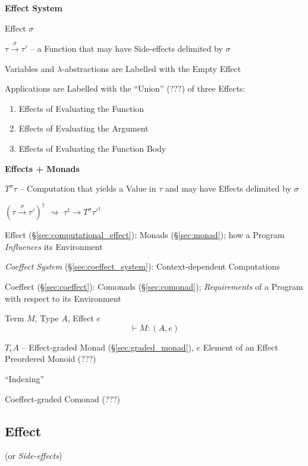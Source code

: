 \textbf{Effect System}

Effect $\sigma$

$\tau \xrightarrow{\sigma} \tau'$ -- a Function that may have
Side-effects delimited by $\sigma$

Variables and $\lambda$-abstractions are Labelled with the Empty
Effect

Applications are Labelled with the ``Union'' (???) of three Effects:
\begin{enumerate}
  \item Effects of Evaluating the Function
  \item Effects of Evaluating the Argument
  \item Effects of Evaluating the Function Body
\end{enumerate}


\textbf{Effects + Monads}

$T^\sigma\tau$ -- Computation that yields a Value in $\tau$ and may
have Effects delimited by $\sigma$

$(\tau \xrightarrow{\sigma} \tau')^\dag$
$\rightsquigarrow$
$\tau^\dag \rightarrow T^\sigma \tau'^\dag$


\asterism


Effect (\S\ref{sec:computational_effect}): Monads (\S\ref{sec:monad});
how a Program \emph{Influences} its Environment

\emph{Coeffect System} (\S\ref{sec:coeffect_system}):
Context-dependent Computations

Coeffect (\S\ref{sec:coeffect}): Comonads (\S\ref{sec:comonad});
\emph{Requirements} of a Program with respect to its Environment

Term $M$, Type $A$, Effect $e$
\[
  \vdash M :(A,e)
\]

$T_e A$ -- Effect-graded Monad (\S\ref{sec:graded_monad}), $e$ Element
of an Effect Preordered Monoid (???)

``Indexing''

Coeffect-graded Comonad (???)



\subsection{Effect}\label{sec:effect}

(or \emph{Side-effects})

